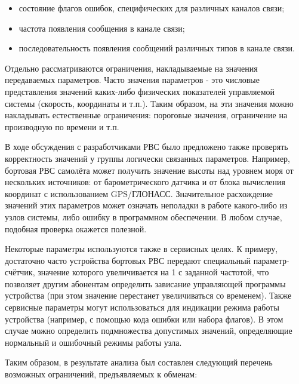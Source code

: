\begin{itemize}
 \item состояние флагов ошибок, специфических для различных каналов связи;
 \item частота появления сообщения в канале связи;
 \item последовательность появления сообщений различных типов в канале связи.
\end{itemize}

Отдельно рассматриваются ограничения, накладываемые на значения передаваемых 
параметров. Часто значения параметров - это числовые представления значений 
каких-либо физических показателей управляемой системы (скорость, координаты и 
т.п.). Таким образом, на эти значения можно накладывать естественные 
ограничения: пороговые значения, ограничение на производную по времени и т.п.

В ходе обсуждения с разработчиками РВС было предложено также проверять 
корректность значений у группы логически связанных параметров. Например, 
бортовая РВС самолёта может получить значение высоты над уровнем моря от 
нескольких источников: от барометрического датчика и от блока вычисления 
координат с использованием GPS/ГЛОНАСС. Значительное расхождение значений 
этих параметров может означать неполадки в работе какого-либо из узлов системы, 
либо ошибку в программном обеспечении. В любом случае, подобная проверка 
окажется полезной.

Некоторые параметры используются также в сервисных целях. К примеру, 
достаточно часто устройства бортовых РВС передают специальный 
параметр-счётчик, значение которого увеличивается на 1 с заданной частотой, что 
позволяет другим абонентам определить зависание управляющей программы 
устройства (при этом значение перестанет увеличиваться со временем). Также 
сервисные параметры могут использоваться для индикации режима работы устройства 
(например, с помощью кода ошибки или набора флагов). В этом случае можно 
определить подмножества допустимых значений, определяющие нормальный и 
ошибочный режимы работы узла.

Таким образом, в результате анализа был составлен следующий перечень 
возможных ограничений, предъявляемых к обменам:

